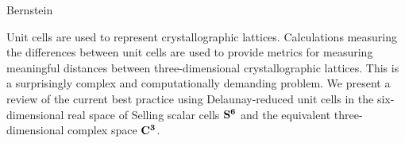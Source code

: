 \documentclass[preprint]{iucr}              %
\numberwithin{equation}{section}
\newcommand{\SVI}[0]{$\bf{S^{6}}$}
\newcommand{\CIII}[0]{$\bf{C^{3}}$}
\begin{document}
	
	\author[b]{Herbert J.}{Bernstein}
	
	
	
	
	
	
	
	
	
	
	\maketitle                        %
	\begin{synopsis}
        Unit cells are used to represent crystallographic lattices.
		Calculations measuring the differences between unit
		cells are used to provide metrics for measuring meaningful
		distances between three-dimensional crystallographic
		lattices.  This is a surprisingly complex and
		computationally demanding problem.  We present a
		review of the current best practice using 
		Delaunay-reduced unit cells
		in the six-dimensional real space of Selling
		scalar cells \SVI{} and the equivalent three-dimensional complex space \CIII{}.
	\end{synopsis}
	\newcommand{\si}[0]{$s_1$}
	\newcommand{\sii}[0]{$s_2$}
	\newcommand{\siii}[0]{$s_3$}
	\newcommand{\siv}[0]{$s_4$}
	\newcommand{\sv}[0]{$s_5$}
	\newcommand{\svi}[0]{$s_6$}
	\newcommand{\Svec} [0] {\{\si, \sii, \siii, \siv, \sv, \svi \}}
	\newcommand{\SvecA} [0] {\{-\si, -\si+\sii, \si+\siii, \si+\sv, \si+\siv, \si+\svi \}}
	
\end{document}
